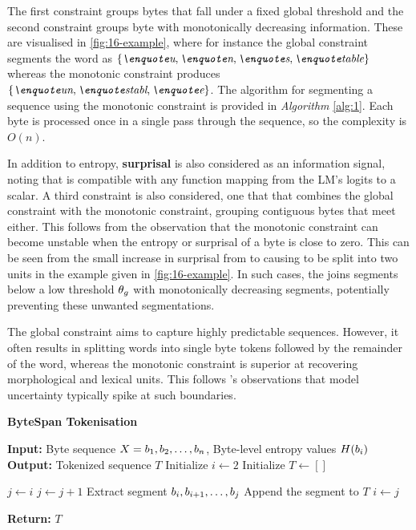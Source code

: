 The first constraint groups bytes that fall under a fixed global threshold and the second constraint groups byte with monotonically decreasing information. These are visualised in \cref{fig:16-example}, where for instance the global constraint segments the word  as $\{\ex{u}, \ex{n}, \ex{s}, \ex{table} \}$ whereas the monotonic constraint produces $\{\ex{un}, \ex{stabl}, \ex{e}\}$. The algorithm for segmenting a sequence using the monotonic constraint is provided in \emph{Algorithm} \ref{alg:1}. Each byte is processed once in a single pass through the sequence, so the complexity is \(O(n)\). 

In addition to entropy, \textbf{surprisal} is also considered as an information signal, noting that \tokname is compatible with any function mapping from the LM's logits to a scalar. A third constraint is also considered, one that that combines the global constraint with the monotonic constraint, grouping contiguous bytes that meet either. This follows from the observation that the monotonic constraint can become unstable when the entropy or surprisal of a byte is close to zero. This can be seen from the small increase in surprisal from  to  causing  to be split into two units in the example given in \cref{fig:16-example}. In such cases, the  joins segments below a low threshold \(\theta_g \) with monotonically decreasing segments, potentially preventing these unwanted segmentations.


The global constraint aims to capture highly predictable sequences. However, it often results in splitting words into single byte tokens followed by the remainder of the word, whereas the monotonic constraint is superior at recovering morphological and lexical units. This follows \citet{elman-1990-finding}'s observations that model uncertainty typically spike at such boundaries.

\begin{algorithm}[t]
\caption{\textbf{ByteSpan Tokenisation}}
\begin{algorithmic}[1]
\STATE \textbf{Input:} Byte sequence $X = b_1, b_2, \dots, b_n$, Byte-level entropy values $H(b_i)$
\STATE \textbf{Output:} Tokenized sequence $T$
\STATE Initialize $i \gets 2$ 
\STATE Initialize $T \gets []$ 

    \STATE $j \gets i$
        \STATE $j \gets j + 1$
    \ENDWHILE
    \STATE Extract segment $b_i, b_{i+1}, \dots, b_{j}$
    \STATE Append the segment to $T$
    \STATE $i \gets j$
\ENDWHILE

\STATE \textbf{Return:} $T$
\end{algorithmic}
\label{alg:1}
\end{algorithm}

